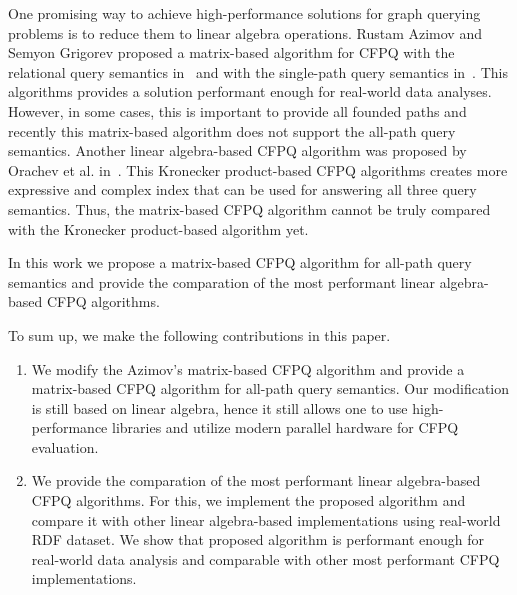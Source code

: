 One promising way to achieve high-performance solutions for graph querying problems is to reduce them to linear algebra operations. Rustam Azimov and Semyon Grigorev proposed a matrix-based algorithm for CFPQ with the relational query semantics in~\cite{Azimov:2018:CPQ:3210259.3210264} and with the single-path query semantics in~\cite{10.1145/3398682.3399163}.
This algorithms provides a solution performant enough for real-world data analyses.
However, in some cases, this is important to provide all founded paths and recently this matrix-based algorithm does not support the all-path query semantics. Another linear algebra-based CFPQ algorithm was proposed by Orachev et al. in~\cite{}. This Kronecker product-based CFPQ algorithms creates more expressive and complex index that can be used for answering all three query semantics. Thus, the matrix-based CFPQ algorithm cannot be truly compared with the Kronecker product-based algorithm yet.

In this work we propose a matrix-based CFPQ algorithm for all-path query semantics and provide the comparation of the most performant linear algebra-based CFPQ algorithms.

To sum up, we make the following contributions in this paper.
\begin{enumerate}
	\item We modify the Azimov's matrix-based CFPQ algorithm and provide a matrix-based CFPQ algorithm for all-path query semantics.
	Our modification is still based on linear algebra, hence it still allows one to use high-performance libraries and utilize modern parallel hardware for CFPQ evaluation.
	\item We provide the comparation of the most performant linear algebra-based CFPQ algorithms. For this, we implement the proposed algorithm and compare it with other linear algebra-based implementations using real-world RDF dataset. We show that proposed algorithm is performant enough for real-world data analysis and comparable with other most performant CFPQ implementations.
\end{enumerate}